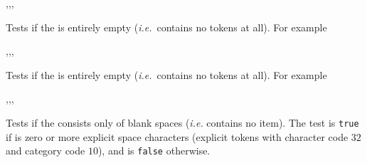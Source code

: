 \documentclass[oneside]{book}
\begin{document}
\begin{function}{\tlIfEmpty,\tlIfEmptyT,\tlIfEmptyF,\tlIfEmptyTF}
\begin{syntax}
 
  
  
   
\end{syntax}
Tests if the  is entirely empty
(\emph{i.e.}~contains no tokens at all). For example
\begin{demohigh}
 {} {}
\tlIfEmptyTF {} {} {}
\end{demohigh}
\end{function}

\begin{function}{\tlVarIfEmpty,\tlVarIfEmptyT,\tlVarIfEmptyF,\tlVarIfEmptyTF}
\begin{syntax}
 
  
  
   
\end{syntax}
Tests if the  is entirely empty
(\emph{i.e.}~contains no tokens at all). For example
\begin{demohigh}
\tlSet {}
\tlVarIfEmptyTF {} {}
\tlClear \lTmpaTl
\tlVarIfEmptyTF {} {}
\end{demohigh}
\end{function}

\begin{function}{\tlIfBlank,\tlIfBlankT,\tlIfBlankF,\tlIfBlankTF}
\begin{syntax}
 
  
  
   
\end{syntax}
Tests if the  consists only of blank spaces
(\emph{i.e.} contains no item). The test is \texttt{true} if
 is zero or more explicit space characters
(explicit tokens with character code $32$ and category code $10$),
and is \texttt{false} otherwise.
\begin{demohigh}
\tlIfEmptyTF {  } {} {}
\tlIfBlankTF {  } {} {}
\end{demohigh}
\end{function}
\end{document}
